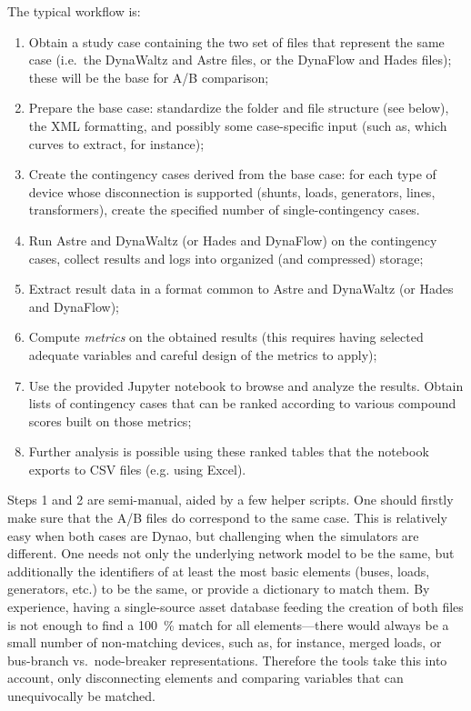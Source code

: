 \documentclass[conference]{IEEEtran}
\newcommand{\Dynawo}{Dyna\textomega o} %
\begin{document}
The typical workflow is:
\begin{enumerate}
  \item Obtain a study case containing the two set of files that represent the
        same case (i.e.~the DynaWaltz and Astre files, or the DynaFlow and Hades
        files); these will be the base for A/B comparison;
  \item Prepare the base case: standardize the folder and file structure (see
        below), the XML formatting, and possibly some case-specific input (such as,
        which curves to extract, for instance);
  \item Create the contingency cases derived from the base case: for each type
        of device whose disconnection is supported (shunts, loads, generators,
        lines, transformers), create the specified number of single-contingency
        cases.
  \item Run Astre and DynaWaltz (or Hades and DynaFlow) on the contingency
        cases, collect results and logs into organized (and compressed)
        storage;
  \item Extract result data in a format common to Astre and DynaWaltz (or Hades
        and DynaFlow);
  \item Compute \emph{metrics} on the obtained results (this requires having
        selected adequate variables and careful design of the metrics to apply);
  \item Use the provided Jupyter notebook to browse and analyze the results.
        Obtain lists of contingency cases that can be ranked according to various
        compound scores built on those metrics;
  \item Further analysis is possible using these ranked tables that
        the notebook exports to CSV files (e.g. using Excel).
\end{enumerate}

Steps 1 and 2 are semi-manual, aided by a few helper scripts.  One should
firstly make sure that the A/B files do correspond to the same case. This is
relatively easy when both cases are \Dynawo, but challenging when the simulators
are different.  One needs not only the underlying network model to be the same,
but additionally the identifiers of at least the most basic elements (buses,
loads, generators, etc.) to be the same, or provide a dictionary to match them.
By experience, having a single-source asset database feeding the creation of
both files is not enough to find a \SI{100}{\%} match for all elements---there
would always be a small number of non-matching devices, such as, for instance,
merged loads, or bus-branch vs.\ node-breaker representations. Therefore the
tools take this into account, only disconnecting elements and comparing
variables that can unequivocally be matched.
\end{document}
